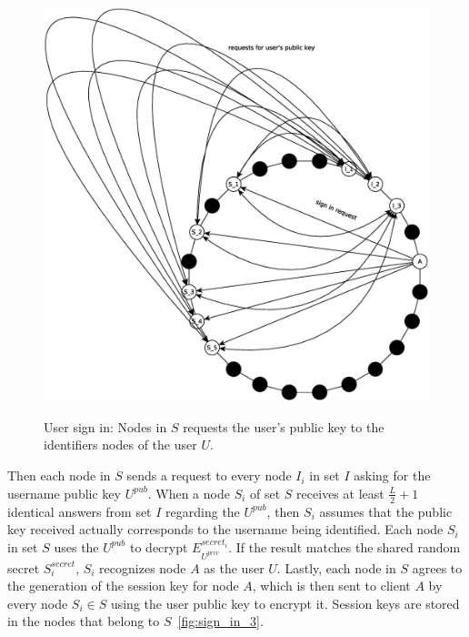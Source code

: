 \begin{figure}[!htb]
\centering
\includegraphics[width=14cm]{../img/sign_in_2}\\
\caption{User sign in: Nodes in $S$ requests the user's public key to the
identifiers nodes of the user $U$.}
\label{fig:sign_in_2}
\end{figure}

Then each node in $S$ sends a request to every node $I_i$ in set $I$ asking for the username public key $U^{pub}$. When a node
$S_i$ of set $S$ receives at least $\frac{L}{2} + 1$ identical answers from
set $I$ regarding the $U^{pub}$, then $S_i$ assumes that the public key received
actually corresponds to the username being identified. Each node $S_i$ in set $S$
uses the $U^{pub}$ to decrypt $E^{secret_i}_{U^{priv}}$. If the result matches
the shared random secret $S^{secret}_i$, $S_i$ recognizes node $A$ as the
user $U$.
Lastly, each node in $S$ agrees to the generation of the session key for 
node $A$, which is then sent to client $A$ by every node $S_i \in S$ using
the user public key to encrypt it. Session keys are stored in the
nodes that belong to $S$~\ref{fig:sign_in_3}.

